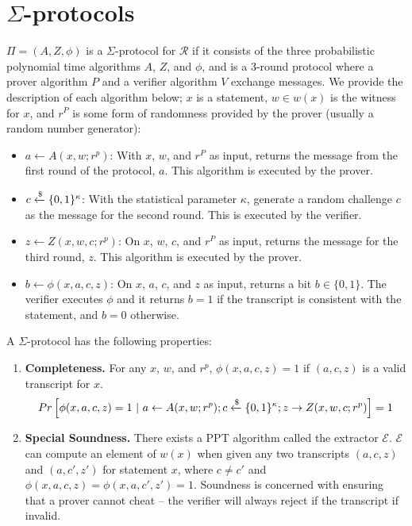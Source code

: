 \section{$\Sigma$-protocols}
\begin{definition}\label{def:sigma}
$\Pi = (A, Z, \phi)$ is a $\Sigma$-protocol for $\mathcal R$ if it consists of the three probabilistic polynomial time algorithms $A$, $Z$, and $\phi$, and is a 3-round protocol where a prover algorithm $P$ and a verifier algorithm $V$ exchange messages. We provide the description of each algorithm below; $x$ is a statement, $w \in w(x)$ is the witness for $x$, and $r^P$ is some form of randomness provided by the prover (usually a random number generator):
\begin{itemize}
    \item $a \leftarrow A(x,w; r^p)$: With $x$, $w$, and $r^P$ as input, returns the message from the first round of the protocol, $a$. This algorithm is executed by the prover.
    \item $c \xleftarrow{\$} \{0,1\}^\kappa$: With the statistical parameter $\kappa$, generate a random challenge $c$ as the message for the second round. This is executed by the verifier.
    \item $z \leftarrow Z(x,w,c; r^p)$: On $x$, $w$, $c$, and $r^P$ as input, returns the message for the third round, $z$. This algorithm is executed by the prover.
    \item $b \leftarrow \phi(x,a,c,z)$: On $x$, $a$, $c$, and $z$ as input, returns a bit $b \in \{0,1\}$. The verifier executes $\phi$ and it returns $b = 1$ if the transcript is consistent with the statement, and $b = 0$ otherwise.
\end{itemize}
A $\Sigma$-protocol has the following properties:
\begin{enumerate}
    \item \textbf{Completeness.} For any $x$, $w$, and $r^p$, $\phi(x,a,c,z) = 1$ if $(a,c,z)$ is a valid transcript for $x$.
    $$
    \begin{gathered}
        Pr\left[\phi(x,a,c,z) = 1 \ \vert\  a \leftarrow A(x,w;r^p); c\xleftarrow{\$} \{0,1\}^\kappa; z \rightarrow Z(x,w,c;r^p)\right] = 1
    \end{gathered}
    $$
    \item \textbf{Special Soundness.} There exists a PPT algorithm called the extractor $\mathcal E$. $\mathcal E$ can compute an element of $w(x)$ when given any two transcripts $(a,c,z)$ and $(a,c',z')$ for statement $x$, where $c \ne c'$ and $\phi(x,a,c,z) = \phi(x,a,c',z') = 1$. Soundness is concerned with ensuring that a prover cannot cheat -- the verifier will always reject if the transcript if invalid.
    

\end{enumerate}
\end{definition}
